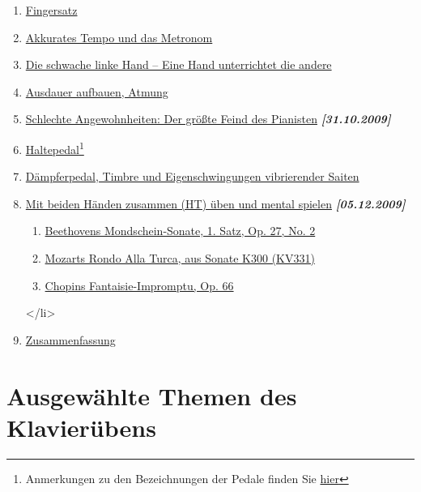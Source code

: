 \begin{enumerate}
 \item \hyperref[c1ii18]{Fingersatz}
 \item \hyperref[c1ii19]{Akkurates Tempo und das Metronom}
 \item \hyperref[c1ii20]{Die schwache linke Hand -- Eine Hand unterrichtet die andere}
 \item \hyperref[c1ii21]{Ausdauer aufbauen, Atmung}

 \item \hyperref[c1ii22]{Schlechte Angewohnheiten: Der größte Feind des Pianisten} \textbf{\textit{[31.10.2009]}}
 \item \hyperref[c1ii23]{Haltepedal}\footnote{Anmerkungen zu den Bezeichnungen der Pedale finden Sie \hyperref[Pedale]{hier}}
 
 \item \hyperref[c1ii24]{Dämpferpedal, Timbre und Eigenschwingungen vibrierender Saiten}
 \item \hyperref[c1ii25]{Mit beiden Händen zusammen (HT) üben und mental spielen} \textbf{\textit{[05.12.2009]}}
  \begin{enumerate}[label={\alph*.}] 
   <li>\hyperref[c1ii25a]{Einführung}
   \item \hyperref[c1ii25b]{Beethovens Mondschein-Sonate, 1. Satz, Op. 27, No. 2}
   \item \hyperref[c1ii25c]{Mozarts Rondo Alla Turca, aus Sonate K300 (KV331)}
   \item \hyperref[c1ii25d]{Chopins Fantaisie-Impromptu, Op. 66}
  \end{enumerate}
 </li>
 \item \hyperref[c1ii26]{Zusammenfassung}
 \end{enumerate}

\section{Ausgewählte Themen des Klavierübens}

